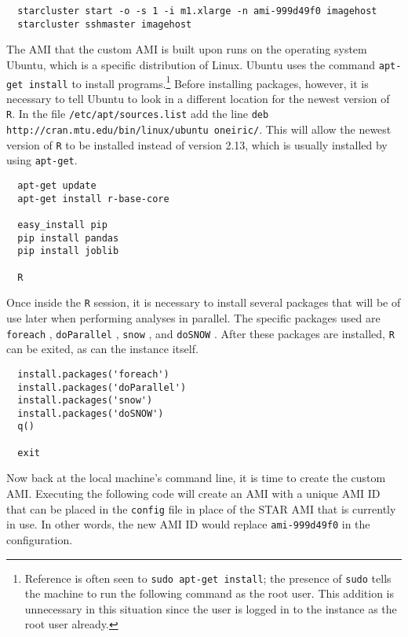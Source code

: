 \documentclass[12pt, letterpaper]{article}
\newcommand{\R}{\texttt{R}} %
\begin{document}
\begin{verbatim}
  starcluster start -o -s 1 -i m1.xlarge -n ami-999d49f0 imagehost
  starcluster sshmaster imagehost
\end{verbatim}

\noindent
The AMI that the custom AMI is built upon runs on the operating system Ubuntu, which is a specific distribution of Linux.
Ubuntu uses the command \texttt{apt-get install} to install programs.\footnote{Reference is often seen to \texttt{sudo apt-get
install}; the presence of \texttt{sudo} tells the machine to run the following command as the root user. This addition is
unnecessary in this situation since the user is logged in to the instance as the root user already.}
Before installing packages, however, it is necessary to tell Ubuntu to look in a different location for the newest version of \R. 
In the file \texttt{/etc/apt/sources.list} add the line \texttt{deb http://cran.mtu.edu/bin/linux/ubuntu oneiric/}. This will allow 
the newest version of \texttt{R} to be installed instead of version 2.13, which is usually installed by using \texttt{apt-get}.

\begin{verbatim}  
  apt-get update
  apt-get install r-base-core
  
  easy_install pip
  pip install pandas
  pip install joblib
  
  R
\end{verbatim}

\noindent
Once inside the \texttt{R} session, it is necessary to install several packages that will be of use later when performing analyses in parallel. 
The specific packages used are \texttt{foreach} \citep{foreach}, \texttt{doParallel} \citep{doParallel}, \texttt{snow} \citep{snow},
and \texttt{doSNOW} \citep{doSNOW}. After these packages are installed, \texttt{R} can be exited, as can the instance itself. 

\begin{verbatim}
  install.packages('foreach')
  install.packages('doParallel')
  install.packages('snow')
  install.packages('doSNOW')
  q()
  
  exit
\end{verbatim}

Now back at the local machine's command line, it is time to create the custom AMI. Executing the following code will
create an AMI with a unique AMI ID that can be placed in the \texttt{config} file in place of the STAR
AMI that is currently in use. In other words, the new AMI ID would replace \texttt{ami-999d49f0} in the configuration.
\end{document}
